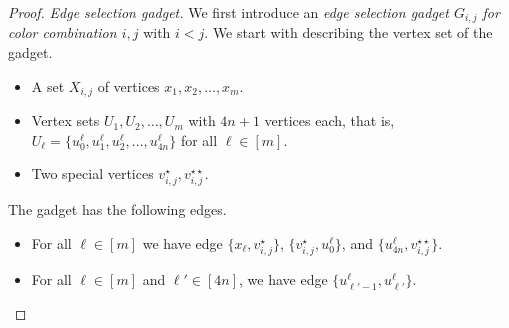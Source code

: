 \documentclass[a4paper,UKenglish,cleveref, autoref, thm-restate]{lipics-v2021}
\begin{document}
\begin{proof}
    \emph{Edge selection gadget.} We first introduce an \emph{edge selection gadget $G_{i,j}$ for color combination $i,j$} with $i<j$. We start with describing the vertex set of the gadget.
    \begin{itemize}
        \item A set $X_{i,j}$ of vertices $x_1, x_2, \ldots, x_m$.
        \item Vertex sets $U_1, U_2, \ldots, U_m$ with $4n+1$ vertices each, that is, $U_\ell=\{u^\ell_0, u^\ell_1, u^\ell_2,\ldots, 
        u^\ell_{4n}\}$ for all $\ell\in[m]$. 
        \item Two special vertices $v_{i,j}^\star,v_{i,j}^{\star\star}$.
    \end{itemize}
    The gadget has the following edges.
    \begin{itemize}
        \item For all $\ell\in [m]$ we have edge $\{x_\ell,v_{i,j}^\star\}$, $\{v_{i,j}^\star,u^\ell_0\}$, and $\{u^\ell_{4n},v_{i,j}^{\star\star}\}$. 

        \item For all $\ell\in [m]$ and $\ell'\in [4n]$, we have edge $\{u^\ell_{\ell'-1},u^\ell_{\ell'}\}$.
    \end{itemize}


\end{proof}
\end{document}
